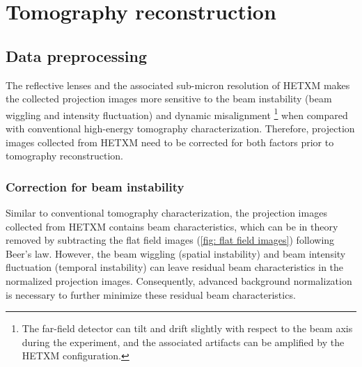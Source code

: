 \documentclass[12pt]{scrartcl}
\begin{document}
\section{Tomography reconstruction}\label{sec: tomo}

\subsection{Data preprocessing}\label{sec: preprocessing}

The reflective lenses and the associated sub-micron resolution of HETXM makes the collected projection images more sensitive to the beam instability (beam wiggling and intensity fluctuation) and dynamic misalignment \footnote{
The far-field detector can tilt and drift slightly with respect to the beam axis during the experiment, and the associated artifacts can be amplified by the HETXM configuration.
} 
when compared with conventional high-energy tomography characterization.
Therefore, projection images collected from HETXM need to be corrected for both factors prior to tomography reconstruction.

\subsubsection{
Correction for beam instability
}\label{sec: bg norm}

Similar to conventional tomography characterization, the projection images collected from HETXM contains beam characteristics, which can be in theory removed by subtracting the flat field images (\cref{fig: flat field images}) following Beer's law. 
However, the beam wiggling (spatial instability) and beam intensity fluctuation (temporal instability) can leave residual beam characteristics in the normalized projection images.
Consequently, advanced background normalization is necessary to further minimize these residual beam characteristics.
\end{document}

